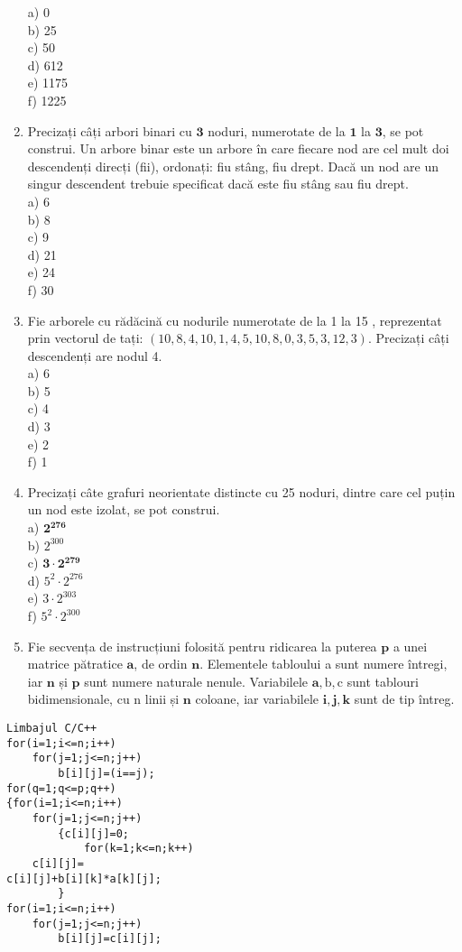 \begin{enumerate}
a) 0\\
b) 25\\
c) 50\\
d) 612\\
e) 1175\\
f) 1225
  \item Precizați câți arbori binari cu $\mathbf{3}$ noduri, numerotate de la $\mathbf{1}$ la $\mathbf{3}$, se pot construi. Un arbore binar este un arbore în care fiecare nod are cel mult doi descendenți direcți (fii), ordonați: fiu stâng, fiu drept. Dacă un nod are un singur descendent trebuie specificat dacă este fiu stâng sau fiu drept.\\
a) 6\\
b) 8\\
c) 9\\
d) 21\\
e) 24\\
f) 30
  \item Fie arborele cu rădăcină cu nodurile numerotate de la 1 la 15 , reprezentat prin vectorul de tați: $(10,8,4,10,1,4,5,10,8,0,3,5,3,12,3)$. Precizați câți descendenți are nodul 4.\\
a) 6\\
b) 5\\
c) 4\\
d) 3\\
e) 2\\
f) 1
  \item Precizați câte grafuri neorientate distincte cu 25 noduri, dintre care cel puțin un nod este izolat, se pot construi.\\
a) $\mathbf{2}^{\mathbf{2 7 6}}$\\
b) $2^{300}$\\
c) $\mathbf{3} \cdot \mathbf{2}^{\mathbf{2 7 9}}$\\
d) $5^{2} \cdot 2^{276}$\\
e) $3 \cdot 2^{303}$\\
f) $5^{2} \cdot 2^{300}$
  \item Fie secvența de instrucțiuni folosită pentru ridicarea la puterea $\mathbf{p}$ a unei matrice pătratice $\mathbf{a}$, de ordin $\mathbf{n}$. Elementele tabloului a sunt numere întregi, iar $\mathbf{n}$ și $\mathbf{p}$ sunt numere naturale nenule. Variabilele $\mathbf{a}, \mathrm{b}, \mathrm{c}$ sunt tablouri bidimensionale, cu n linii și $\mathbf{n}$ coloane, iar variabilele $\mathbf{i}, \mathbf{j}, \mathbf{k}$ sunt de tip întreg.
\end{enumerate}

\begin{verbatim}
Limbajul C/C++
for(i=1;i<=n;i++)
    for(j=1;j<=n;j++)
        b[i][j]=(i==j);
for(q=1;q<=p;q++)
{for(i=1;i<=n;i++)
    for(j=1;j<=n;j++)
        {c[i][j]=0;
            for(k=1;k<=n;k++)
    c[i][j]=
c[i][j]+b[i][k]*a[k][j];
        }
for(i=1;i<=n;i++)
    for(j=1;j<=n;j++)
        b[i][j]=c[i][j];
\end{verbatim}

